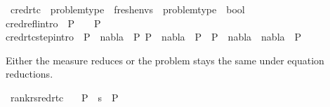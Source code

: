 \begin{isabellebody}
\isanewline
\isanewline
{}\isamarkupfalse%
\ cred{\isacharunderscore}{\kern0pt}rtc\ {\isacharcolon}{\kern0pt}{\isacharcolon}{\kern0pt}\ {\isachardoublequoteopen}problem{\isacharunderscore}{\kern0pt}type\ {\isasymRightarrow}\ fresh{\isacharunderscore}{\kern0pt}envs\ {\isasymRightarrow}\ problem{\isacharunderscore}{\kern0pt}type\ {\isasymRightarrow}\ bool{\isachardoublequoteclose}\ {\isacharparenleft}{\kern0pt}{\isachardoublequoteopen}{\isacharunderscore}{\kern0pt}\ {\isasymturnstile}\ {\isacharunderscore}{\kern0pt}\ {\isasymrightarrow}\isactrlsup {\isacharasterisk}{\kern0pt}\ {\isacharunderscore}{\kern0pt}\ {\isachardoublequoteclose}\ {\isacharbrackleft}{\kern0pt}{}{}{\isacharcomma}{\kern0pt}{}{}{\isacharcomma}{\kern0pt}{}{}{\isacharbrackright}{\kern0pt}\ {}{}{\isacharparenright}{\kern0pt}\isanewline
\ \ \isanewline
cred{\isacharunderscore}{\kern0pt}refl{\isacharbrackleft}{\kern0pt}intro{\isacharbang}{\kern0pt}{\isacharbrackright}{\kern0pt}\ {\isacharcolon}{\kern0pt}\ {\isachardoublequoteopen}P{}\ {\isasymturnstile}\ {\isacharbraceleft}{\kern0pt}{\isacharbraceright}{\kern0pt}\ {\isasymrightarrow}\isactrlsup {\isacharasterisk}{\kern0pt}\ P{}{\isachardoublequoteclose}\ {\isacharbar}{\kern0pt}\isanewline
cred{\isacharunderscore}{\kern0pt}rtc{\isacharunderscore}{\kern0pt}step{\isacharbrackleft}{\kern0pt}intro{\isacharbang}{\kern0pt}{\isacharbrackright}{\kern0pt}\ {\isacharcolon}{\kern0pt}\ {\isachardoublequoteopen}{\isasymlbrakk}P{}\ {\isasymturnstile}\ nabla{}\ {\isasymrightarrow}\ P{}{\isacharsemicolon}{\kern0pt}\ P{}\ {\isasymturnstile}\ nabla{}\ {\isasymrightarrow}\isactrlsup {\isacharasterisk}{\kern0pt}\ P{}{\isasymrbrakk}\ {\isasymLongrightarrow}\ P{}\ {\isasymturnstile}\ {\isacharparenleft}{\kern0pt}nabla{}\ {\isasymunion}\ nabla{}{\isacharparenright}{\kern0pt}\ {\isasymrightarrow}\isactrlsup {\isacharasterisk}{\kern0pt}\ P{}{\isachardoublequoteclose}%
\begin{isamarkuptext}%
Either the measure reduces or the problem stays the same under equation reductions.%
\end{isamarkuptext}\isamarkuptrue%
\isamarkupfalse%
\ rank{\isacharunderscore}{\kern0pt}r{\isacharunderscore}{\kern0pt}sred{\isacharunderscore}{\kern0pt}rtc{\isacharcolon}{\kern0pt}\isanewline
\ \ \ {\isachardoublequoteopen}P{}\ {\isasymturnstile}\ s\ {\isasymleadsto}\isactrlsup {\isacharasterisk}{\kern0pt}\ P{}{\isachardoublequoteclose}\isanewline

\end{isabellebody}
